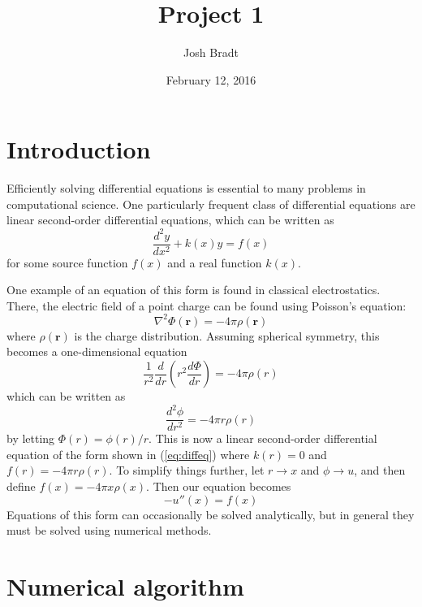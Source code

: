 \documentclass{article}
\title{Project 1}
\author{Josh Bradt}
\date{February 12, 2016}
\begin{document}
\maketitle

\section{Introduction}

    Efficiently solving differential equations is essential to many problems in computational science. One particularly frequent class of differential equations are linear second-order differential equations, which can be written as
    \begin{equation}
        \frac{d^2 y}{dx^2} + k(x) y = f(x)  \label{eq:diffeq}
    \end{equation}
    for some source function $f(x)$ and a real function $k(x)$.

    One example of an equation of this form is found in classical electrostatics. There, the electric field of a point charge can be found using Poisson's equation:
    \begin{equation}
        \nabla^2 \Phi(\mathbf{r}) = -4\pi \rho(\mathbf{r})  \label{eq:poisson}
    \end{equation}
    where $\rho(\mathbf{r})$ is the charge distribution. Assuming spherical symmetry, this becomes a one-dimensional equation
    \begin{equation*}
        \frac{1}{r^2} \frac{d}{dr} \left( r^2 \frac{d\Phi}{dr} \right) = -4\pi\rho(r)
    \end{equation*}
    which can be written as
    \begin{equation*}
        \frac{d^2\phi}{dr^2} = -4\pi r \rho(r)
    \end{equation*}
    by letting $\Phi(r) = \phi(r) / r$. This is now a linear second-order differential equation of the form shown in (\ref{eq:diffeq}) where $k(r) = 0$ and $f(r) = -4\pi r \rho(r)$. To simplify things further, let $r \rightarrow x$ and $\phi \rightarrow u$, and then define $f(x) = -4\pi x \rho(x)$. Then our equation becomes
    \begin{equation*}
        -u''(x) = f(x)
    \end{equation*}
    Equations of this form can occasionally be solved analytically, but in general they must be solved using numerical methods.

\section{Numerical algorithm}
\end{document}
